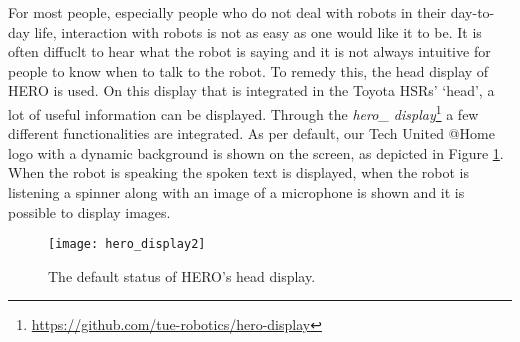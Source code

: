 \label{ssec:display}
For most people, especially people who do not deal with robots in their day-to-day life, interaction with robots is not as easy as one would like it to be. It is often diffuclt to hear what the robot is saying and it is not always intuitive for people to know when to talk to the robot. To remedy this, the head display of HERO is used. On this display that is integrated in the Toyota HSRs' `head', a lot of useful information can be displayed. Through the \emph{hero\_ display}\footnote{\url{https://github.com/tue-robotics/hero-display}} a few different functionalities are integrated. As per default, our Tech United @Home logo with a dynamic background is shown on the screen, as depicted in Figure \ref{fig:hero_display}. When the robot is speaking the spoken text is displayed, when the robot is listening a spinner along with an image of a microphone is shown and it is possible to display images.

\begin{figure}[h]
    \centering
	\texttt{[image: hero\_display2]}
	\caption{
		The default status of HERO's head display.}
	\label{fig:hero_display}
\end{figure}